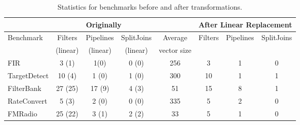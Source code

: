 \begin{table*}[t]
\vspace{-6pt}
\centering
\small
\begin{tabular}{|l|c|c|c||c||c|c|c|} 
\hline
          & \multicolumn{3}{|c||}{Originally}  &             & \multicolumn{3}{|c|}{After Linear Replacement} \\
\hline
Benchmark & Filters & Pipelines & SplitJoins & Average     & Filters      & Pipelines         & SplitJoins \\
          & (linear)& (linear)  & (linear)   & vector size &              &                   &            \\
\hline
FIR       & 3 (1)  & 1(0)      & 0 (0)      & 256         & 3            & 1                 & 0 \\
\hline
TargetDetect & 10 (4)& 1 (0)    & 1 (0)      & 300         & 10           & 1                 & 1 \\
\hline
FilterBank & 27 (25) & 17 (9)   & 4 (3)      & 51          & 15           & 8                 & 1 \\
\hline
RateConvert& 5 (3)   & 2 (0)    & 0 (0)      & 335         & 5            & 2                 & 0 \\
\hline
FMRadio    & 25 (22) & 3 (1)    & 2 (2)      & 33          & 5            & 1                 & 0 \\
\hline
\end{tabular}
\vspace{-3pt}
\caption{Statistics for benchmarks before and after transformations.
\protect\label{fig:benchmark-statistics}}
\vspace{-4pt}
\end{table*}
